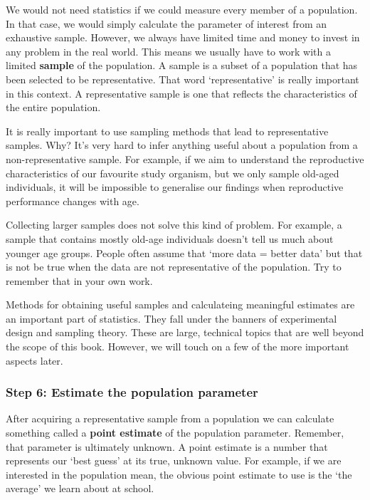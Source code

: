 \documentclass[
]{book}
\begin{document}
We would not need statistics if we could measure every member of a population. In that case, we would simply calculate the parameter of interest from an exhaustive sample. However, we always have limited time and money to invest in any problem in the real world. This means we usually have to work with a limited \textbf{sample} of the population. A sample is a subset of a population that has been selected to be representative. That word `representative' is really important in this context. A representative sample is one that reflects the characteristics of the entire population.

It is really important to use sampling methods that lead to representative samples. Why? It's very hard to infer anything useful about a population from a non-representative sample. For example, if we aim to understand the reproductive characteristics of our favourite study organism, but we only sample old-aged individuals, it will be impossible to generalise our findings when reproductive performance changes with age.

Collecting larger samples does not solve this kind of problem. For example, a sample that contains mostly old-age individuals doesn't tell us much about younger age groups. People often assume that `more data = better data' but that is not be true when the data are not representative of the population. Try to remember that in your own work.

Methods for obtaining useful samples and calculateing meaningful estimates are an important part of statistics. They fall under the banners of experimental design and sampling theory. These are large, technical topics that are well beyond the scope of this book. However, we will touch on a few of the more important aspects later.

\hypertarget{step-6-estimate-the-population-parameter}{%
\subsubsection*{Step 6: Estimate the population parameter}\label{step-6-estimate-the-population-parameter}}

After acquiring a representative sample from a population we can calculate something called a \textbf{point estimate} of the population parameter. Remember, that parameter is ultimately unknown. A point estimate is a number that represents our `best guess' at its true, unknown value. For example, if we are interested in the population mean, the obvious point estimate to use is the `the average' we learn about at school.
\end{document}
